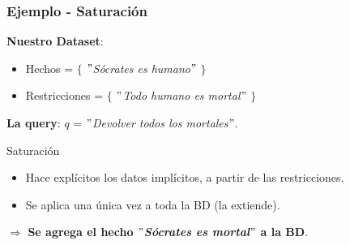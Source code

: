 \documentclass{beamer}
\begin{document}
\begin{frame}
\frametitle{Ejemplo - Saturación}

\textbf{Nuestro Dataset}:
\begin{itemize}
\item Hechos = $\lbrace$ \textit{$"$Sócrates es humano$"$} $\rbrace$
\item Restricciones = $\lbrace$ \textit{$"$Todo humano es mortal$"$} $\rbrace$
\end{itemize}

\vspace{1 mm}

\textbf{La query}: $q$ = \textit{$"$Devolver todos los mortales$"$}.

\vspace{8 mm}

\begin{exampleblock}{Saturación}

\begin{itemize}
\item Hace explícitos los datos implícitos, a partir de las restricciones.
\item Se aplica una única vez a toda la BD (la extiende).
\end{itemize}
\hspace{1cm}$\Rightarrow$ \textbf{Se agrega el hecho \textit{$"$Sócrates es mortal$"$} a la BD}.

\end{exampleblock}

\end{frame}

\end{document}
